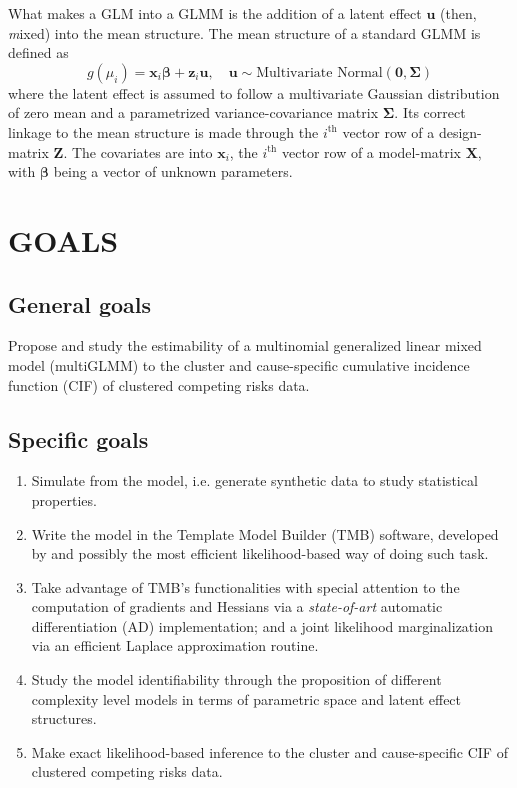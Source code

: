 What makes a GLM into a GLMM \cite{GLMM} is the addition of a latent
effect \(\bm{u}\) (then, \textit{m}ixed) into the mean structure. The
mean structure of a standard GLMM is defined as
\[
  g(\mu_{i}) = \bm{x}_{i}\bm{\beta} + \bm{z}_{i}\bm{u},
  \quad \bm{u} \sim \text{Multivariate Normal}(\bm{0},\bm{\Sigma})
\]
where the latent effect is assumed to follow a multivariate Gaussian
distribution of zero mean and a parametrized variance-covariance matrix
\(\bm{\Sigma}\). Its correct linkage to the mean structure is made
through the \(i^\text{th}\) vector row of a design-matrix \(\bm{Z}\).
The covariates are into \(\bm{x}_{i}\), the \(i^\text{th}\) vector row
of a model-matrix \(\bm{X}\), with \(\bm{\beta}\) being a vector of
unknown parameters.

\section{GOALS}

\subsection{General goals}

Propose and study the estimability of a multinomial generalized linear
mixed model (multiGLMM) to the cluster and cause-specific cumulative
incidence function (CIF) of clustered competing risks data.

\subsection{Specific goals}

\begin{enumerate}
 \item Simulate from the model, i.e. generate synthetic data to study
       statistical properties.

 \item Write the model in the Template Model Builder (TMB) software,
       developed by  and possibly the most efficient
       likelihood-based way of doing such task.

 \item Take advantage of TMB's functionalities with special attention to
       the computation of gradients and Hessians via a
       \textit{state-of-art} automatic differentiation (AD)
       implementation; and a joint likelihood marginalization via an
       efficient Laplace approximation routine.

 \item Study the model identifiability through the proposition of
       different complexity level models in terms of parametric space
       and latent effect structures.

 \item Make exact likelihood-based inference to the cluster and
       cause-specific CIF of clustered competing risks data.
\end{enumerate}

